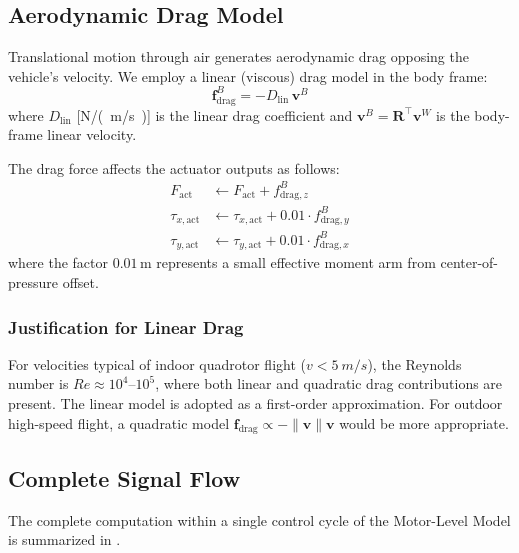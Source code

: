 \documentclass[journal]{IEEEtran}
\newcommand{\R}{\mathbf{R}}
\begin{document}
\subsection{Aerodynamic Drag Model}

Translational motion through air generates aerodynamic drag opposing the vehicle's velocity. We employ a linear (viscous) drag model in the body frame:
\begin{equation}
  \mathbf{f}_{\text{drag}}^B = -D_{\text{lin}} \, \mathbf{v}^B
  \label{eq:drag}
\end{equation}
where $D_{\text{lin}}$ [\si{N/(m/s)}] is the linear drag coefficient and $\mathbf{v}^B = \R^\top \mathbf{v}^W$ is the body-frame linear velocity.

The drag force affects the actuator outputs as follows:
\begin{align}
  F_{\text{act}} &\leftarrow F_{\text{act}} + f_{\text{drag},z}^B \label{eq:drag_thrust} \\
  \tau_{x,\text{act}} &\leftarrow \tau_{x,\text{act}} + 0.01 \cdot f_{\text{drag},y}^B \label{eq:drag_tx} \\
  \tau_{y,\text{act}} &\leftarrow \tau_{y,\text{act}} + 0.01 \cdot f_{\text{drag},x}^B \label{eq:drag_ty}
\end{align}
where the factor $0.01$\,m represents a small effective moment arm from center-of-pressure offset.

\subsubsection{Justification for Linear Drag}

For velocities typical of indoor quadrotor flight ($v < \SI{5}{m/s}$), the Reynolds number is $Re \approx 10^4$--$10^5$, where both linear and quadratic drag contributions are present. The linear model is adopted as a first-order approximation. For outdoor high-speed flight, a quadratic model $\mathbf{f}_{\text{drag}} \propto -\|\mathbf{v}\| \mathbf{v}$ would be more appropriate.

\subsection{Complete Signal Flow}
\label{sec:signal_flow}

The complete computation within a single control cycle of the Motor-Level Model is summarized in .
\end{document}
